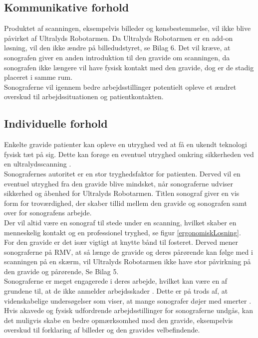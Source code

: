 \subsection{Kommunikative forhold}
Produktet af scanningen, eksempelvis billeder og kønsbestemmelse, vil ikke blive påvirket af Ultralyds Robotarmen. Da Ultralyds Robotarmen er en add-on løsning, vil den ikke ændre på billedudstyret, se Bilag 6. 
Det vil kræve, at sonografen giver en anden introduktion til den gravide om scanningen, da sonografen ikke længere vil have fysisk kontakt med den gravide, dog er de stadig placeret i samme rum.  \\
Sonograferne vil igennem bedre arbejdsstillinger potentielt opleve et ændret overskud til arbejdssituationen og patientkontakten.  

\subsection{Individuelle forhold}
Enkelte gravide patienter kan opleve en utryghed ved at få en ukendt teknologi fysisk tæt på sig. Dette kan forøge en eventuel utryghed omkring sikkerheden ved en ultralydsscanning \cite{29}. \\
Sonografernes autoritet er en stor tryghedsfaktor for patienten. Derved vil en eventuel utryghed fra den gravide blive mindsket, når sonograferne udviser sikkerhed og åbenhed for Ultralyds Robotarmen. Titlen sonograf giver en vis form for troværdighed, der skaber tillid mellem den gravide og sonografen samt over for sonografens arbejde.\\
Der vil altid være en sonograf til stede under en scanning, hvilket skaber en menneskelig kontakt og en professionel tryghed, se figur \ref{ergonomiskLosning}.\\
For den gravide er det især vigtigt at knytte bånd til fosteret. Derved mener sonograferne på RMV, at så længe de gravide og deres pårørende kan følge med i scanningen på en skærm, vil Ultralyds Robotarmen ikke have stor påvirkning på den gravide og pårørende, Se Bilag 5. \\  
Sonograferne er meget engagerede i deres arbejde, hvilket kan være en af grundene til, at de ikke anmelder arbejdsskader \cite{1}\cite{24}. Dette er på trods af, at videnskabelige undersøgelser som viser, at mange sonografer døjer med smerter \cite{24}\cite{32}\cite{36}. 
Hvis akavede og fysisk udfordrende arbejdsstillinger for sonograferne undgås, kan det muligvis skabe en bedre opmærksomhed mod den gravide, eksempelvis overskud til forklaring af billeder og den gravides velbefindende. 
 
